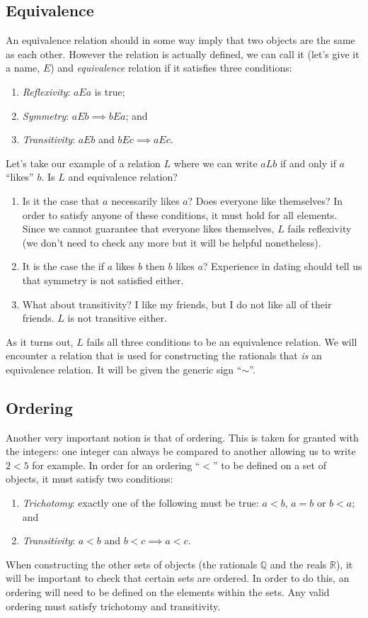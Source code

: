 \documentclass[]{scrartcl}
\theoremstyle{definition}
\newcommand{\bb}[1]{\mathbb{#1}}
\newcommand{\Q}{\bb{Q}}
\newcommand{\R}{\bb{R}}
\begin{document}
\subsection{Equivalence}
An equivalence relation should in some way imply that two objects are the same as each other. However the relation is actually defined, we can call it (let's give it a name, $E$) and \textit{equivalence} relation if it satisfies three conditions:
\begin{enumerate}
    \item \textit{Reflexivity}: $aEa$ is true;
    \item \textit{Symmetry}: $aEb \implies bEa$; and
    \item \textit{Transitivity}: $aEb$ and $bEc \implies aEc$.
\end{enumerate}
Let's take our example of a relation $L$ where we can write $aLb$ if and only if $a$ ``likes'' $b$. Is $L$ and equivalence relation?
\begin{enumerate}
    \item Is it the case that $a$ necessarily likes $a$? Does everyone like themselves? In order to satisfy anyone of these conditions, it must hold for all elements. Since we cannot guarantee that everyone likes themselves, $L$ fails reflexivity (we don't need to check any more but it will be helpful nonetheless).
    \item It is the case the if $a$ likes $b$ then $b$ likes $a$? Experience in dating should tell us that symmetry is not satisfied either.
    \item What about transitivity? I like my friends, but I do not like all of their friends. $L$ is not transitive either.
\end{enumerate}
As it turns out, $L$ fails all three conditions to be an equivalence relation. We will encounter a relation that is used for constructing the rationals that \textit{is} an equivalence relation. It will be given the generic sign ``$\sim$''.

\subsection{Ordering}
Another very important notion is that of ordering. This is taken for granted with the integers: one integer can always be compared to another allowing us to write $2 < 5$ for example. In order for an ordering ``$<$'' to be defined on a set of objects, it must satisfy two conditions:
\begin{enumerate}
    \item \textit{Trichotomy}: exactly one of the following must be true: $a<b$, $a=b$ or $b<a$; and
    \item \textit{Transitivity}: $a<b$ and $b<c \implies a<c$.
\end{enumerate}
When constructing the other sets of objects (the rationals $\Q$ and the reals $\R$), it will be important to check that certain sets are ordered. In order to do this, an ordering will need to be defined on the elements within the sets. Any valid ordering must satisfy trichotomy and transitivity.
\end{document}
